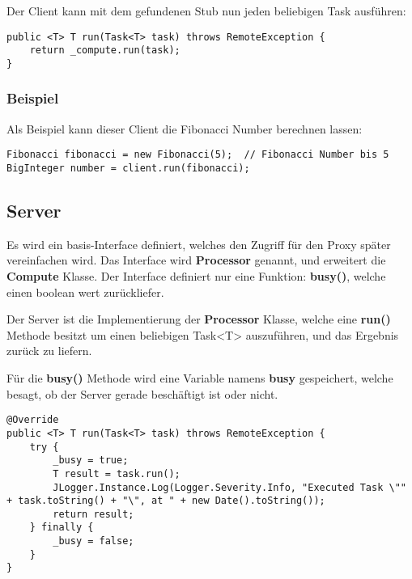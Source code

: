 Der Client kann mit dem gefundenen Stub nun jeden beliebigen Task ausführen:

\begin{lstlisting}[style=Java, caption=Client Implementation - Task run]
public <T> T run(Task<T> task) throws RemoteException {
    return _compute.run(task);
}
\end{lstlisting}

\subsubsection{Beispiel}

Als Beispiel kann dieser Client die Fibonacci Number berechnen lassen:

\begin{lstlisting}[style=Java, caption=Client Implementation - Fibonacci Beispiel]
Fibonacci fibonacci = new Fibonacci(5);  // Fibonacci Number bis 5
BigInteger number = client.run(fibonacci);
\end{lstlisting}

\clearpage

\subsection{Server}
Es wird ein basis-Interface definiert, welches den Zugriff für den Proxy später vereinfachen wird. Das Interface wird \textbf{Processor} genannt, und erweitert die \textbf{Compute} Klasse. 
Der Interface definiert nur eine Funktion: \textbf{busy()}, welche einen boolean wert zurückliefer.

Der Server ist die Implementierung der \textbf{Processor} Klasse, welche eine \textbf{run()} Methode besitzt um einen beliebigen Task<T> auszuführen, und das Ergebnis zurück zu liefern.

Für die \textbf{busy()} Methode wird eine Variable namens \textbf{busy} gespeichert, welche besagt, ob der Server gerade beschäftigt ist oder nicht.

\begin{lstlisting}[style=Java, caption=Server Implementation - run Methode]
@Override
public <T> T run(Task<T> task) throws RemoteException {
	try {
    	_busy = true;
        T result = task.run();
        JLogger.Instance.Log(Logger.Severity.Info, "Executed Task \"" + task.toString() + "\", at " + new Date().toString());
		return result;
    } finally {
    	_busy = false;
    }
}
\end{lstlisting}

\clearpage

